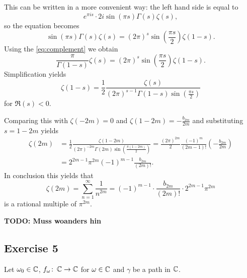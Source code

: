 \documentclass[a4paper,english]{article}
\begin{document}
This can be written in a more convenient way: the left hand side is equal to
\begin{equation*}
    e^{\pi i s} \cdot 2 i \sin(\pi s) \Gamma(s) \zeta(s),
\end{equation*}
so the equation becomes
\begin{equation*}
    \sin(\pi s) \Gamma(s) \zeta(s)
    = (2 \pi)^s \sin\left(\frac{\pi s}{2} \right) \zeta(1 - s).
\end{equation*}
Using the \eqref{eq:complement} we obtain
\begin{equation*}
    \frac{\pi}{\Gamma(1 - s)} \zeta(s)
    = (2 \pi)^s \sin\left(\frac{\pi s}{2} \right) \zeta(1 - s).
\end{equation*}
Simplification yields
\begin{equation*}
    \boxed{\zeta(1 - s)
    = \frac{1}{2} \frac{\zeta(s)}{(2 \pi)^{s - 1} \Gamma(1 - s) \sin\left(\frac{\pi s}{2} \right)}}
\end{equation*}
for $\Re(s) < 0$.

Comparing this with \hyperref[eq:zeta1]{$\zeta(-2 m) = 0$} and \hyperref[eq:zeta2]{$\zeta(1 - 2 m) = - \frac{b_{2m}}{2 m}$} and substituting $s = 1 - 2m$ yields
\begin{align*}
    \zeta(2 m)
    & = \frac{1}{2} \frac{\zeta(1 - 2 m)}{(2 \pi)^{- 2 m} \Gamma(2 m) \sin\left(\frac{\pi (1 - 2 m)}{2} \right)}
    = \frac{(2 \pi)^{2m}}{2} \frac{(-1)^m}{(2 m - 1)!} \left( -\frac{b_{2m}}{2 m }\right) \\
    & = 2^{2 m - 1} \pi^{2 m} (-1)^{m - 1} \frac{b_{2m}}{(2 m)!}.
\end{align*}
In conclusion this yields that
\begin{equation*}
    \zeta(2 m )
    = \sum_{n = 1}^{\infty} \frac{1}{n^{2 m}}
    = (-1)^{m - 1} \cdot \frac{b_{2 m}}{(2 m)!} \cdot 2^{2 m - 1} \pi^{2 m}
\end{equation*}
is a rational multiple of $\pi^{2 m}$.

\textbf{TODO: Muss woanders hin} 
\subsection{Exercise 5}
Let $\omega_0 \in \operatorname{\mathbb{C}}$, $f_{\omega} \colon \operatorname{\mathbb{C}} \to \operatorname{\mathbb{C}}$ for $\omega \in \operatorname{\mathbb{C}}$ and $\gamma$ be a path in $\operatorname{\mathbb{C}}$.
\end{document}
